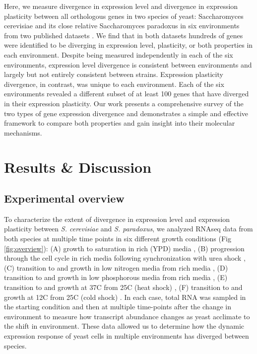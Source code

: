 Here, we measure divergence in expression level and divergence in expression plasticity between all orthologous genes in two species of yeast: Saccharomyces cerevisiae and its close relative Saccharomyces paradoxus in six environments from two published datasets \cite{Krieger2020, Fay2023}. We find that in both datasets hundreds of genes were identified to be diverging in expression level, plasticity, or both properties in each environment. Despite being measured independently in each of the six environments, expression level divergence is consistent between environments and largely but not entirely consistent between strains. Expression plasticity divergence, in contrast, was unique to each environment. Each of the six environments revealed a different subset of at least 100 genes that have diverged in their expression plasticity. Our work presents a comprehensive survey of the two types of gene expression divergence and demonstrates a simple and effective framework to compare both properties and gain insight into their molecular mechanisms.

\section{Results \& Discussion}

\subsection{Experimental overview}

To characterize the extent of divergence in expression level and expression plasticity between \textit{S. cerevisiae} and \textit{S. paradoxus}, we analyzed RNAseq data from both species at multiple time points in six different growth conditions (Fig \ref{fig:overview}): (A) growth to saturation in rich (YPD) media \cite{Krieger2020}, (B) progression through the cell cycle in rich media following synchronization with urea shock \cite{Lupo2021}, (C) transition to and growth in low nitrogen media from rich media \cite{Krieger2020}, (D) transition to and growth in low phosphorous media from rich media \cite{Krieger2020, }, (E) transition to and growth at 37C from 25C (heat shock) \cite{Fay2023}, (F) transition to and growth at 12C from 25C (cold shock) \cite{Fay2023}. In each case, total RNA was sampled in the starting condition and then at multiple time-points after the change in environment to measure how transcript abundance changes as yeast acclimate to the shift in environment. These data allowed us to determine how the dynamic expression response of yeast cells in multiple environments has diverged between species.

